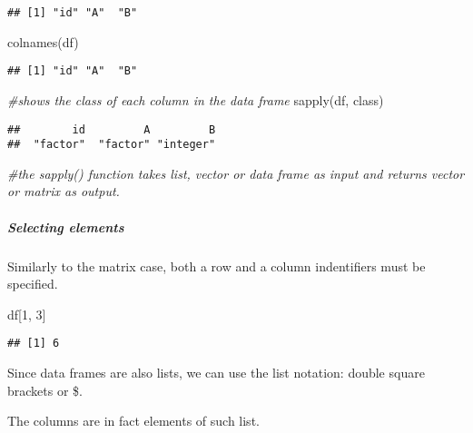 \documentclass[
]{article}
\newenvironment{Shaded}{\begin{snugshade}}{\end{snugshade}}
\newcommand{\CommentTok}[1]{\textcolor[rgb]{0.56,0.35,0.01}{\textit{#1}}}
\newcommand{\DecValTok}[1]{\textcolor[rgb]{0.00,0.00,0.81}{#1}}
\newcommand{\FunctionTok}[1]{\textcolor[rgb]{0.00,0.00,0.00}{#1}}
\newcommand{\NormalTok}[1]{#1}
\begin{document}
\begin{verbatim}
## [1] "id" "A"  "B"
\end{verbatim}

\begin{Shaded}
\begin{Highlighting}[]
\FunctionTok{colnames}\NormalTok{(df)}
\end{Highlighting}
\end{Shaded}

\begin{verbatim}
## [1] "id" "A"  "B"
\end{verbatim}

\begin{Shaded}
\begin{Highlighting}[]
\CommentTok{\#shows the class of each column in the data frame}
\FunctionTok{sapply}\NormalTok{(df, class) }
\end{Highlighting}
\end{Shaded}

\begin{verbatim}
##        id         A         B 
##  "factor"  "factor" "integer"
\end{verbatim}

\begin{Shaded}
\begin{Highlighting}[]
\CommentTok{\#the sapply() function takes list, vector or data frame as input and returns vector or matrix as output.}
\end{Highlighting}
\end{Shaded}

\hypertarget{selecting-elements-1}{%
\subparagraph{Selecting elements}\label{selecting-elements-1}}

Similarly to the matrix case, both a row and a column indentifiers must
be specified.

\begin{Shaded}
\begin{Highlighting}[]
\NormalTok{df[}\DecValTok{1}\NormalTok{, }\DecValTok{3}\NormalTok{]}
\end{Highlighting}
\end{Shaded}

\begin{verbatim}
## [1] 6
\end{verbatim}

Since data frames are also lists, we can use the list notation: double
square brackets or \$.

The columns are in fact elements of such list.
\end{document}
